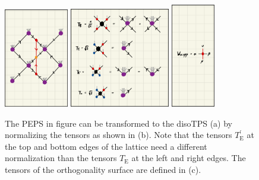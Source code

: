 \begin{figure}
	\centering
	\subcaptionbox{\label{fig:toric_code_disoTPS_representation}}
	{%
		\includegraphics[width=0.25\textwidth]{figures/Toric_Code/toric_code_disoTPS.jpeg}
	}
	\subcaptionbox{\label{fig:toric_code_disoTPS_representation_tensor_definitions}}
	{%
		\includegraphics[width=0.39\textwidth]{figures/Toric_Code/toric_code_disoTPS_tensor_definitions.jpeg}
	}
	\subcaptionbox{\label{fig:toric_code_disoTPS_representation_ortho_surface_tensor}}
	{%
		\includegraphics[width=0.17\textwidth]{figures/Toric_Code/toric_code_disoTPS_ortho_surface_tensor.jpeg}
	}
	\caption{The PEPS in figure \protect{} can be transformed to the disoTPS (a) by normalizing the tensors as shown in (b). Note that the tensors $T_\text{E}^\prime$ at the top and bottom edges of the lattice need a different normalization than the tensors $T_\text{E}$ at the left and right edges. The tensors of the orthogonality surface are defined in (c).}
	\label{fig:toric_code_disoTPS}
\end{figure}


